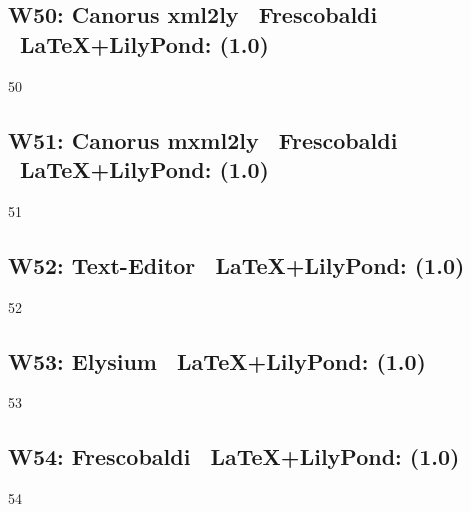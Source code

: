 \subsection{W50: Canorus \ra xml2ly \ra\ Frescobaldi \ra\ \LaTeX+LilyPond: (1.0)}

50

\subsection{W51: Canorus \ra mxml2ly \ra\ Frescobaldi \ra\ \LaTeX+LilyPond: (1.0)}

51

\subsection{W52: Text-Editor \ra\ \LaTeX+LilyPond: (1.0)}

52

\subsection{W53: Elysium \ra\ \LaTeX+LilyPond: (1.0)}

53
\subsection{W54: Frescobaldi \ra\ \LaTeX+LilyPond: (1.0)}

54




